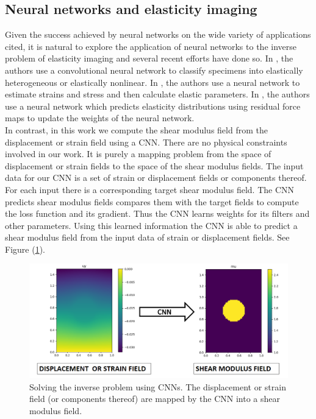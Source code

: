 \documentclass[12pt]{article}
\begin{document}
\subsection{Neural networks and elasticity imaging}
Given the success achieved by neural networks on the wide variety of applications cited, it is natural to explore the application of neural networks to the inverse problem of elasticity imaging and several recent efforts \cite{paper:pateloberai2019,misc:gu2020,paper:hoeriginsana2016} have done so. In \cite{paper:pateloberai2019}, the authors use a convolutional neural network to classify specimens into elastically heterogeneous or elastically nonlinear. In \cite{paper:hoeriginsana2016}, the authors use a neural network to estimate strains and stress and then calculate elastic parameters. In \cite{misc:gu2020}, the authors use a neural network which predicts elasticity distributions using residual force maps to update the weights of the neural network. \\In contrast, in this work we compute the shear modulus field from the displacement or strain field using a CNN. There are no physical constraints involved in our work. It is purely a mapping problem from the space of displacement or strain fields to the space of the shear modulus fields. The input data for our CNN is a set of strain or displacement fields or components thereof. For each input there is a corresponding target shear modulus field. The CNN predicts shear modulus fields compares them with the target fields to compute the loss function and its gradient. Thus the CNN learns weights for its filters and other parameters. Using this learned information the CNN is able to predict a shear modulus field from the input data of strain or displacement fields. See Figure (\ref{fig:schematic_inv}).
%
\begin{figure}[h]
   \centering
    \includegraphics[totalheight=5cm]{Figures/schematic_inv/schematic_inv.png}
  \caption{\label{fig:schematic_inv} Solving the inverse problem using CNNs. The displacement or strain field (or components thereof) are mapped by the CNN into a shear modulus field.}
\end{figure}
%
\end{document}
